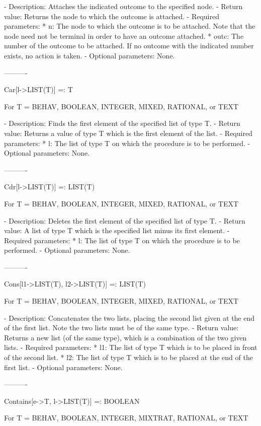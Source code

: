{   -	Description:  Attaches the indicated outcome to the specified node.  
   -	Return value:  Returns the node to which the outcome is attached.
   -	Required parameters:
	  *  n:  The node to which the outcome is to be attached.  Note that
		the node need not be terminal in order to have an outcome 
		attached.
	  *  outc:  The number of the outcome to be attached.  If no outcome 
		with the indicated number exists, no action is taken.  
   -	Optional parameters:  None.

----------

Car[l->LIST(T)] =: T	

	For T = BEHAV, BOOLEAN, INTEGER, MIXED, RATIONAL, or TEXT

   -	Description:  Finds the first element of the specified list of type T.
   -	Return value:  Returns a value of type T which is the first element of 
	the list.
   -	Required parameters:
	  *  l:  The list of type T on which the procedure is to be performed.
   -	Optional parameters:  None.

----------

Cdr[l->LIST(T)] =: LIST(T)

	For T = BEHAV, BOOLEAN, INTEGER, MIXED, RATIONAL, or TEXT

   -	Description:  Deletes the first element of the specified list of type 
	T.
   -	Return value:  A list of type T which is the specified list minus its
	first element.
   -	Required parameters:
	  *  l:  The list of type T on which the procedure is to be performed.
   -	Optional parameters:  None.

----------

Cons[l1->LIST(T), l2->LIST(T)] =: LIST(T)

	For T = BEHAV, BOOLEAN, INTEGER, MIXED, RATIONAL, or TEXT

   -	Description:  Concatenates the two lists, placing the second list given
	at the end of the first list.  Note the two lists must be of the same
	type.
   -	Return value:  Returns a new list (of the same type), which is a 
	combination of the two given lists.
   -	Required parameters:
	  *  l1:  The list of type T which is to be placed in front of the
		second list.
	  *  l2:  The list of type T which is to be placed at the end of the
		first list.
   -	Optional parameters:  None.

----------

Contains[e->T, l->LIST(T)] =: BOOLEAN

	For T = BEHAV, BOOLEAN, INTEGER, MIXTRAT, RATIONAL, or TEXT

}
